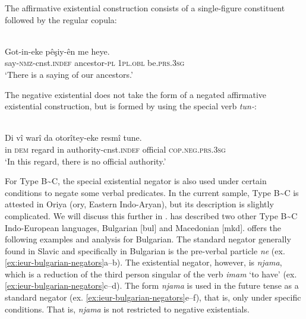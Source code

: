 ﻿\documentclass[output=paper]{langsci/langscibook}
\begin{document}
%
The affirmative existential construction consists of a single-figure constituent followed by the regular copula:
%
\begin{exe}\ex\label{ex:ieur-kurmanji-ancestors}
\\
    \gll Got-in-eke pêşiy-ên      me   heye.  \\
say-\textsc{nmz}-cnst.\textsc{indef} ancestor-\textsc{pl} \textsc{1pl.obl}   be.\textsc{prs.3sg} \\
    \glt `There is a saying of our ancestors.' 
    \end{exe}
%
The negative existential does not take the form of a negated affirmative existential construction, but is formed by using the special verb \textit{tun-}:
%
\begin{exe}\ex\label{ex:ieur-kurmanji-authority}
\\
    \gll Di vî warî    da otorîtey-eke resmî   tune.  \\
in  \textsc{dem}    regard in  authority-cnst.\textsc{indef}  official \textsc{cop.neg.prs.3sg} \\
    \glt `In this regard, there is no official authority.' 
    \end{exe}
%
For Type B{\textasciitilde}C, the special existential negator is also used
under certain conditions to negate some verbal predicates. In the current
sample, Type B{\textasciitilde}C is attested in Oriya (ory, Eastern
Indo-Aryan), but its description is slightly complicated. We will discuss
this further in . \citet{Veselinova2014} has
described two other Type B{\textasciitilde}C Indo-European languages,
Bulgarian [bul] and Macedonian [mkd]. \citet[1332--1333]{Veselinova2014}
offers the following examples and analysis for Bulgarian. The standard
negator generally found in Slavic and specifically in Bulgarian is the
pre-verbal particle \textit{ne} (ex.
\ref{ex:ieur-bulgarian-negators}a--b). The existential negator,
however, is \textit{njama}, which is a reduction of the third person
singular of the verb \textit{imam} `to have' (ex.
\ref{ex:ieur-bulgarian-negators}c--d). The form
\textit{njama} is used in the future tense as a standard negator (ex.
\ref{ex:ieur-bulgarian-negators}e--f), that is, only under specific conditions. That is, \textit{njama} is
not restricted to negative existentials.
%
\end{document}
